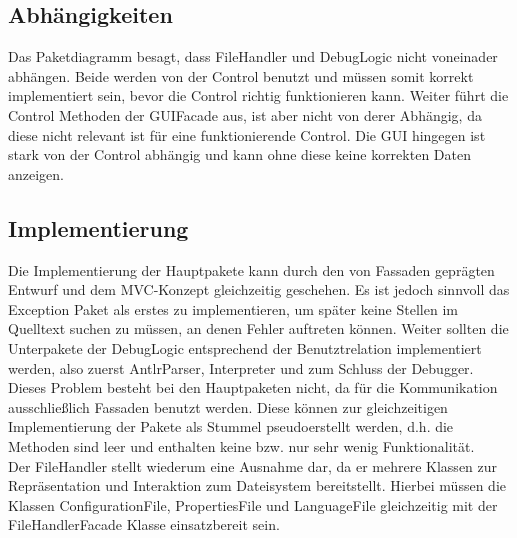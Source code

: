 \documentclass[parskip=full]{scrartcl}
\begin{document}
\subsection{Abhängigkeiten}
Das Paketdiagramm besagt, dass FileHandler und DebugLogic nicht voneinader abhängen.
Beide werden von der Control benutzt und müssen somit korrekt implementiert sein, bevor die Control richtig funktionieren kann. Weiter führt die Control Methoden der GUIFacade aus, ist aber nicht von derer Abhängig, da diese nicht relevant ist für eine funktionierende Control.
Die GUI hingegen ist stark von der Control abhängig und kann ohne diese keine korrekten Daten anzeigen.

\subsection{Implementierung}
Die Implementierung der Hauptpakete kann durch den von Fassaden geprägten Entwurf und dem MVC-Konzept gleichzeitig geschehen. Es ist jedoch sinnvoll das Exception Paket als erstes zu implementieren, um später keine Stellen im Quelltext suchen zu müssen, an denen Fehler auftreten können.
Weiter sollten die Unterpakete der DebugLogic entsprechend der Benutztrelation implementiert werden, also zuerst AntlrParser, Interpreter und zum Schluss der Debugger.
Dieses Problem besteht bei den Hauptpaketen nicht, da für die Kommunikation ausschließlich Fassaden benutzt werden. Diese können zur gleichzeitigen Implementierung der Pakete als Stummel pseudoerstellt werden, d.h. die Methoden sind leer und enthalten keine bzw. nur sehr wenig Funktionalität.\\
Der FileHandler stellt wiederum eine Ausnahme dar, da er mehrere Klassen zur Repräsentation und Interaktion zum Dateisystem bereitstellt.
Hierbei müssen die Klassen ConfigurationFile, PropertiesFile und LanguageFile gleichzeitig mit der FileHandlerFacade Klasse einsatzbereit sein.

\begin{center}
\end{center}
\end{document}
